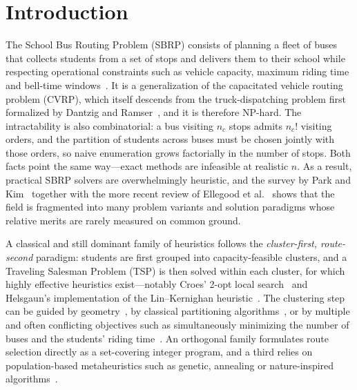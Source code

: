 \documentclass[runningheads]{llncs}
\begin{document}
\section{Introduction}
The School Bus Routing Problem (SBRP) consists of planning a fleet of
buses that collects students from a set of stops and delivers them to
their school while respecting operational constraints such as vehicle
capacity, maximum riding time and bell-time windows~\cite{Park2010TheReview}.
It is a generalization of the capacitated vehicle routing problem
(CVRP), which itself descends from the truck-dispatching problem first
formalized by Dantzig and Ramser~\cite{DantzigRamser1959Truck}, and it
is therefore NP-hard. The intractability is also combinatorial: a bus
visiting $n_c$ stops admits $n_c!$ visiting orders, and the partition
of students across buses must be chosen jointly with those orders, so
naive enumeration grows factorially in the number of stops. Both facts
point the same way---exact methods are infeasible at realistic $n$.
As a result, practical SBRP
solvers are overwhelmingly heuristic, and the survey by Park and
Kim~\cite{Park2010TheReview} together with the more recent review of
Ellegood et al.~\cite{Ellegood2020SchoolDirections} shows that the
field is fragmented into many problem variants and solution paradigms
whose relative merits are rarely measured on common ground.

A classical and still dominant family of heuristics follows the
\emph{cluster-first, route-second} paradigm: students are first
grouped into capacity-feasible clusters, and a Traveling Salesman
Problem (TSP) is then solved within each cluster, for which highly
effective heuristics exist---notably Croes' 2-opt local
search~\cite{Croes1958TwoOpt} and Helsgaun's implementation of the
Lin--Kernighan heuristic~\cite{HelsgaunAnHeuristic}.
The clustering step can be guided by geometry~\cite{CakirRevisitingProblem},
by classical partitioning algorithms~\cite{Comert2018AStudy}, or by
multiple and often conflicting objectives such as simultaneously
minimizing the number of buses and the students' riding
time~\cite{Corberan2002HeuristicObjectives}. An orthogonal family
formulates route selection directly as a set-covering integer
program, and a third relies on population-based metaheuristics such as
genetic, annealing or nature-inspired
algorithms~\cite{Baranwal2016DAVRPTW,Hatamlou2018BlackHole}.
\end{document}
